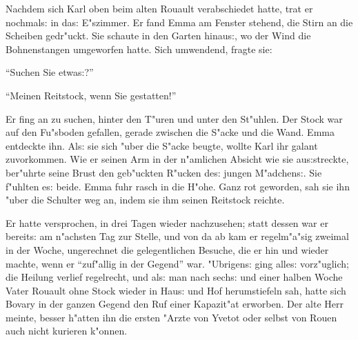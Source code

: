\documentclass[oneside,12pt]{book}
\newcommand{\s}{s:}%
\begin{document}
Nachdem sich Karl oben beim alten Rouault verabschiedet hatte,
trat er nochmal{\s} in da{\s} E"szimmer. Er fand Emma am Fenster
stehend, die Stirn an die Scheiben gedr"uckt. Sie schaute in den
Garten hinau{\s}, wo der Wind die Bohnenstangen umgeworfen hatte.
Sich umwendend, fragte sie:

"`Suchen Sie etwa{\s}?"'

"`Meinen Reitstock, wenn Sie gestatten!"'

Er fing an zu suchen, hinter den T"uren und unter den St"uhlen.
Der Stock war auf den Fu"sboden gefallen, gerade zwischen die
S"acke und die Wand. Emma entdeckte ihn. Al{\s} sie sich "uber die
S"acke beugte, wollte Karl ihr galant zuvorkommen. Wie er seinen
Arm in der n"amlichen Absicht wie sie au{\s}streckte, ber"uhrte
seine Brust den geb"uckten R"ucken de{\s} jungen M"adchen{\s}. Sie
f"uhlten e{\s} beide. Emma fuhr rasch in die H"ohe. Ganz rot
geworden, sah sie ihn "uber die Schulter weg an, indem sie ihm
seinen Reitstock reichte.

Er hatte versprochen, in drei Tagen wieder nachzusehen; statt
dessen war er bereit{\s} am n"achsten Tag zur Stelle, und von da
ab kam er regelm"a"sig zweimal in der Woche, ungerechnet die
gelegentlichen Besuche, die er hin und wieder machte, wenn er
"`zuf"allig in der Gegend"' war. "Ubrigen{\s} ging alle{\s}
vorz"uglich; die Heilung verlief regelrecht, und al{\s} man nach
sech{\s} und einer halben Woche Vater Rouault ohne Stock wieder in
Hau{\s} und Hof herumstiefeln sah, hatte sich Bovary in der ganzen
Gegend den Ruf einer Kapazit"at erworben. Der alte Herr meinte,
besser h"atten ihn die ersten "Arzte von Yvetot oder selbst von
Rouen auch nicht kurieren k"onnen.
\end{document}
